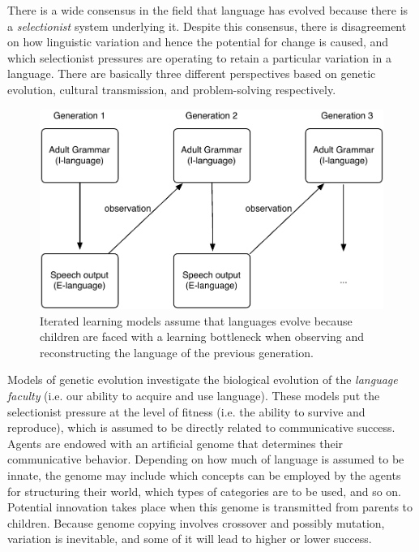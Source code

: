 There is a wide consensus in the field that language has evolved because there is a {\em selectionist} system underlying it. Despite this consensus, there is disagreement on how linguistic variation and hence the potential for change is caused, and which selectionist pressures are operating to retain a particular variation in a language. There are basically three different perspectives based on genetic evolution, cultural transmission, and problem-solving respectively.

\begin{figure}[t]
\centerline{\includegraphics[scale=0.55]{chap-introduction/figs/childbased}}
  \caption[Child-based language change]{Iterated learning models assume that languages evolve because children are faced with a learning bottleneck when observing and reconstructing the language of the previous generation.}
   \label{f:child-based}
\end{figure}

Models of genetic evolution \citep[e.g.][]{briscoe00grammatical, nowak01evolution} investigate the biological evolution of the {\em language faculty} (i.e. our ability to acquire and use language). These models put the selectionist pressure at the level of fitness (i.e. the ability to survive and reproduce), which is assumed to be directly related to communicative success. Agents are endowed with an artificial genome that determines their communicative behavior. Depending on how much of language is assumed to be innate, the genome may include which concepts can be employed by the agents for structuring their world, which types of categories are to be used, and so on. Potential innovation takes place when this genome is transmitted from parents to children. Because genome copying involves crossover and possibly mutation, variation is inevitable, and some of it will lead to higher or lower success.

